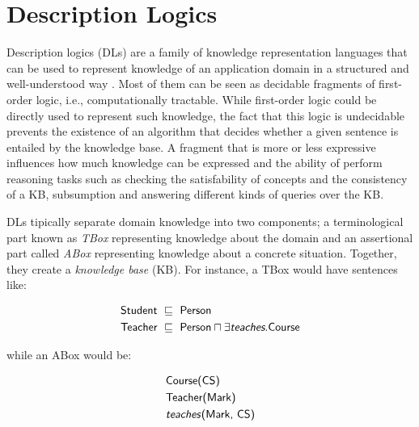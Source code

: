 
\chapter{Description Logics}
\label{chap:description-logics}

Description logics (DLs) are a family of knowledge representation languages that can be used to represent knowledge of an application domain in a structured and well-understood way \citep{Baader2017}. Most of them can be seen as decidable fragments of first-order logic, i.e., computationally tractable. While first-order logic could be directly used to represent such knowledge, the fact that this logic is undecidable prevents the existence of an algorithm that decides whether a given sentence is entailed by the knowledge base. A fragment that is more or less expressive influences how much knowledge can be expressed and the ability of perform reasoning tasks such as checking the satisfability of concepts and the consistency of a KB, subsumption and answering different kinds of queries over the KB.

DLs tipically separate domain knowledge into two components; a terminological part known as \textit{TBox} representing knowledge about the domain and an assertional part called \textit{ABox} representing knowledge about a concrete situation. Together, they create a \textit{knowledge base} (KB). For instance, a TBox would have sentences like:

\begin{equation*}
    \begin{split}
        & \textsf{Student } \sqsubseteq \textsf{ Person} \\
        & \textsf{Teacher } \sqsubseteq \textsf{ Person} \sqcap \exists \textsf{\textit{teaches}.Course}
    \end{split}
\end{equation*}

while an ABox would be:

\begin{equation*}
    \begin{split}
        & \textsf{Course(CS)} \\
        & \textsf{Teacher(Mark)} \\
        & \textsf{\textit{teaches}(Mark, CS)}
    \end{split}
\end{equation*}

